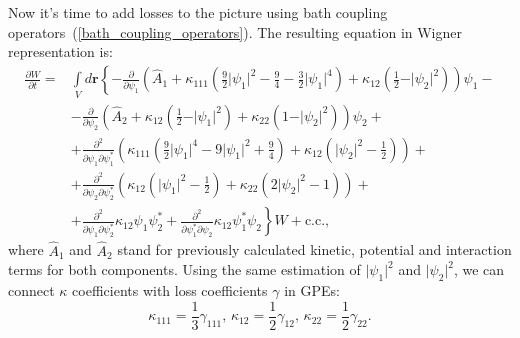 \documentclass[12pt,notitlepage]{report}
\begin{document}
Now it's time to add losses to the picture using bath coupling operators~(\ref{bath_coupling_operators}).
The resulting equation in Wigner representation is:
\begin{equation*}
\begin{split}
\frac{\partial W}{\partial t} = & \int\limits_V d\textbf{r} \left\{ - \frac{\partial}{\partial \psi_1} \left( \hat{A}_1 +
\kappa_{111} \left( \frac{9}{2} \vert \psi_1 \vert^2 - \frac{9}{4} - \frac{3}{2} \vert \psi_1 \vert^4 \right) +
\kappa_{12} \left( \frac{1}{2} - \vert \psi_2 \vert^2 \right) \right) \psi_1 - \right. \\
& \left. - \frac{\partial}{\partial \psi_2} \left( \hat{A}_2 + \kappa_{12} \left( \frac{1}{2} - \vert \psi_1 \vert^2 \right) +
\kappa_{22} \left( 1 - \vert \psi_2 \vert^2 \right) \right) \psi_2 + \right. \\
& \left. + \frac{\partial^2}{\partial \psi_1 \partial \psi_1^*} \left( \kappa_{111} \left(\frac{9}{2} \vert \psi_1 \vert^4 -
9 \vert \psi_1 \vert^2 + \frac{9}{4} \right) + \kappa_{12} \left( \vert \psi_2 \vert^2 - \frac{1}{2} \right) \right) + \right. \\
& \left. + \frac{\partial^2}{\partial \psi_2 \partial \psi_2^*} \left( \kappa_{12} \left( \vert \psi_1 \vert^2 - \frac{1}{2} \right) +
\kappa_{22} \left( 2 \vert \psi_2 \vert^2 - 1 \right) \right) + \right. \\
& \left. + \frac{\partial^2}{\partial \psi_1 \partial \psi_2^*} \kappa_{12} \psi_1 \psi_2^* +
\frac{\partial^2}{\partial \psi_1^* \partial \psi_2} \kappa_{12} \psi_1^* \psi_2
\right\} W + \textrm{c.c.},
\end{split}
\end{equation*}
where $\hat{A}_1$ and $\hat{A}_2$ stand for previously calculated kinetic, potential and interaction terms for both components.
Using the same estimation of $\vert \psi_1 \vert^2$ and $\vert \psi_2 \vert^2$,
we can connect $\kappa$ coefficients with loss coefficients $\gamma$ in GPEs:
\[
\kappa_{111} = \frac{1}{3} \gamma_{111},\,
\kappa_{12} = \frac{1}{2} \gamma_{12},\,
\kappa_{22} = \frac{1}{2} \gamma_{22}.
\]
\end{document}
